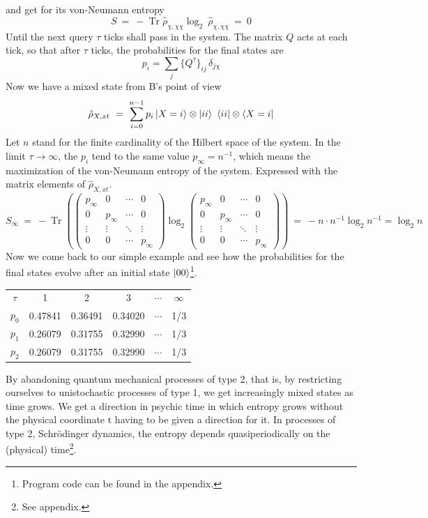 \documentclass[12pt]{article}
\begin{document}
and get for its von-Neumann entropy
\begin{equation}
S\ =\ -\operatorname{Tr} \hat{\rho}_{\chi,\chi\chi} \log_2\ \hat{\rho}_{\chi,\chi\chi}\ = \ 0
\end{equation}
Until the next query $\tau$ ticks shall pass in the system. The matrix $Q$ acts at each tick, so that after $\tau$ ticks, the probabilities for the final states are
\begin{equation}
p_i=\sum_j \{Q^\tau\}_{ij}\, \delta_{j\chi}
\end{equation}
Now we have a mixed state from B's point of view
\begin{equation}
\hat{\rho}_{X,xt}\ = \ \sum_{i=0}^{n-1} p_i \ket{X=i}\otimes\ket{ii}\ \bra{ii}\otimes\bra{X=i} 
\end{equation}
Let $n$ stand for the finite cardinality of the Hilbert space of the system. In the limit $\tau\rightarrow\infty$, the $p_i$ tend to the same value $p_\infty=n^{-1}$, which means the maximization of the von-Neumann entropy of the system. Expressed with the matrix elements of $\hat{\rho}_{X,xt}$.
\begin{equation}
S_\infty\ =\ -\operatorname{Tr} \left(
\begin{pmatrix}
p_\infty&0&\cdots &0\\
0&p_\infty&\cdots &0\\
\vdots &\vdots &\ddots &\vdots \\
0&0&\cdots &p_\infty
\end{pmatrix}
\log_2
\begin{pmatrix}
p_\infty&0&\cdots &0\\
0&p_\infty&\cdots &0\\
\vdots &\vdots &\ddots &\vdots \\
0&0&\cdots &p_\infty
\end{pmatrix} \right)
\ =\ - n \cdot n^{-1} \log_2{n^{-1}} = \log_2{n}
\end{equation}
Now we come back to our simple example and see how the probabilities for the final states evolve after an initial state $\ket{00}$\footnote{Program code can be found in the appendix.}.
\begin{center}
\begin{tabular}{ |c|c|c|c|c|c| } 
 \hline
 $\tau$ & 1 & 2 & 3 & $\cdots$ & $\infty$ \\ 
 $p_0$ & 0.47841 & 0.36491 & 0.34020 & $\cdots$ & 1/3 \\
 $p_1$ & 0.26079 & 0.31755 & 0.32990 & $\cdots$ & 1/3 \\
 $p_2$ & 0.26079 & 0.31755 & 0.32990 & $\cdots$ & 1/3 \\
 \hline
\end{tabular}
\end{center}
By abandoning quantum mechanical processes of type 2, that is, by restricting ourselves to unistochastic processes of type 1, we get increasingly mixed states as time grows. We get a direction in psychic time in which entropy grows without the physical coordinate t having to be given a direction for it. In processes of type 2, Schrödinger dynamics, the entropy depends quasiperiodically on the (physical) time\footnote{See appendix.}.
\end{document}
